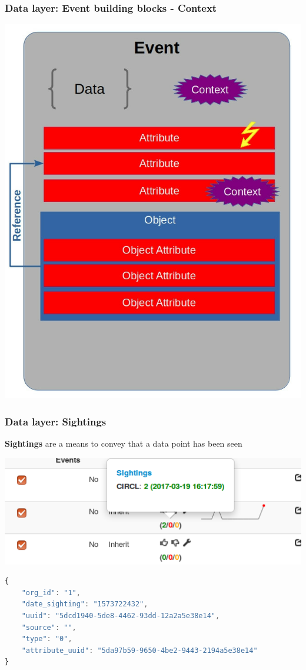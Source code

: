 \begin{frame}
    \frametitle{Data layer: Event building blocks - Context}
        \begin{center}
            \includegraphics[scale=0.33]{screenshots/event-building-blocks/event-attribute-object-context.png}
        \end{center}
\end{frame}

\begin{frame}[fragile]
    \frametitle{Data layer: Sightings}
    {\bf Sightings} are a means to convey that a data point has been seen
    \begin{center}
        \includegraphics[width=1.0\linewidth]{screenshots/sighting-n.png}
    \end{center}
    \begin{lstlisting}[language=javascript,firstnumber=1]
{
    "org_id": "1",
    "date_sighting": "1573722432",
    "uuid": "5dcd1940-5de8-4462-93dd-12a2a5e38e14",
    "source": "",
    "type": "0",
    "attribute_uuid": "5da97b59-9650-4be2-9443-2194a5e38e14"
}
\end{lstlisting}
\end{frame}

